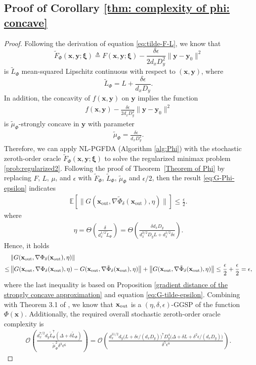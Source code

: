 \documentclass[11pt]{article}
\def\vx{\mathbf{x}}
\def\vy{\mathbf{y}}
\def\vxi{\bm{\xi}}
\def\fO{{\mathcal{O}}}
\def\BE{{\mathbb{E}}}
\begin{document}
\subsection{Proof of Corollary \ref{thm: complexity of phi: concave}}
\begin{proof}
Following the derivation of equation \eqref{eq:tilde-F-L}, we know that
\[ \tilde F_\Phi(\vx,\vy;\vxi) \triangleq F(\vx,\vy;\vxi) - \frac{\delta\epsilon}{2 d_x D_y^2}\|\vy-\vy_0\|^2 \]
is $\tilde{L}_\Phi$ mean-squared Lipschitz continuous with respect to $(\vx,\vy)$, where 
\[\tilde{L}_\Phi=L+\frac{\delta\epsilon}{d_x D_y}.\]
In addition, the concavity of $f(\vx,\vy)$ on $\vy$ implies the function
\begin{align*}
f(\vx,\vy)-\frac{\delta\epsilon}{2 d_x D_y^2}\|\vy-\vy_0\|^2    
\end{align*}
is $\tilde \mu_\Phi$-strongly concave in $\vy$ with parameter
\begin{align*}
\tilde{\mu}_\Phi=\frac{\delta\epsilon}{d_xD_y^2}.    
\end{align*}
Therefore, we can apply NL-PGFDA (Algorithm \ref{alg:Phi}) with the stochastic zeroth-order oracle $\tilde F_\Phi(\vx,\vy;\vxi)$ to solve the regularized minimax problem \eqref{prob:regularized2}.
Following the proof of Theorem~\ref{Theorem of Phi} by replacing 
$F$, $L$, $\mu$, and $\epsilon$ with $\tilde F_\Phi$, $\tilde L_\Phi$, $\tilde \mu_\Phi$ and $\epsilon/2$, then the result \eqref{eq:G-Phi-epsilon} indicates 
\begin{align}\label{eq:G-tilde-epsilon} 
\BE\left[\|G(\vx_{\mathrm{out}},\nabla \tilde\Phi_\delta(\vx_{\mathrm{out}}),\eta)\|\right]
\leq  \frac{\epsilon}{2}.
\end{align}
where
\begin{align*}    
\eta=\Theta\left(\frac{\delta}{d_x^{1/2}\tilde L_\Phi}\right)
=\Theta\left(\frac{\delta d_xD_y}{d_x^{3/2}D_y L+d_x^{1/2}\delta\epsilon}\right).
\end{align*}
Hence, it holds
\begin{align*}
& \left\|G(\vx_{\rm out},\nabla\Phi_\delta(\vx_{\rm out}),\eta)\right\| \\
\le & \left\|G(\vx_{\rm out},\nabla\Phi_\delta(\vx_{\rm out}),\eta) - G(\vx_{\rm out},\nabla\tilde\Phi_\delta(\vx_{\rm out}),\eta)\right\|
    +\left\|G(\vx_{\rm out},\nabla\tilde\Phi_\delta(\vx_{\rm out}),\eta)\right\|
\le \frac{\epsilon}{2}+\frac{\epsilon}{2}=\epsilon,
\end{align*}
where the last inequality is based on 
Proposition \ref{gradient distance of the strongly concave approximation} and equation  \eqref{eq:G-tilde-epsilon}.
Combining with Theorem 3.1 of \citet{lin2022gradient}, we know that $\vx_{\rm out}$ is a $(\eta,\delta,\epsilon)$-GGSP of the function $\Phi(\vx)$.
Additionally, the required overall stochastic zeroth-order oracle complexity is
\begin{align*}
\fO\left(\frac{ d_x^{7/2} d_y \tilde L_\Phi^7(\Delta+\delta \tilde L_\Phi)}{\tilde\mu_\Phi^2\delta^3 \epsilon^6}\right)
=
\fO\left(\frac{ d_x^{11/2} d_y \big(L+\delta\epsilon/(d_x D_y)\big)^7D_y^4 \big(\Delta+\delta L+\delta^2\epsilon/(d_x D_y)\big)}{\delta^5 \epsilon^8}\right).
\end{align*}
\end{proof}
\end{document}
